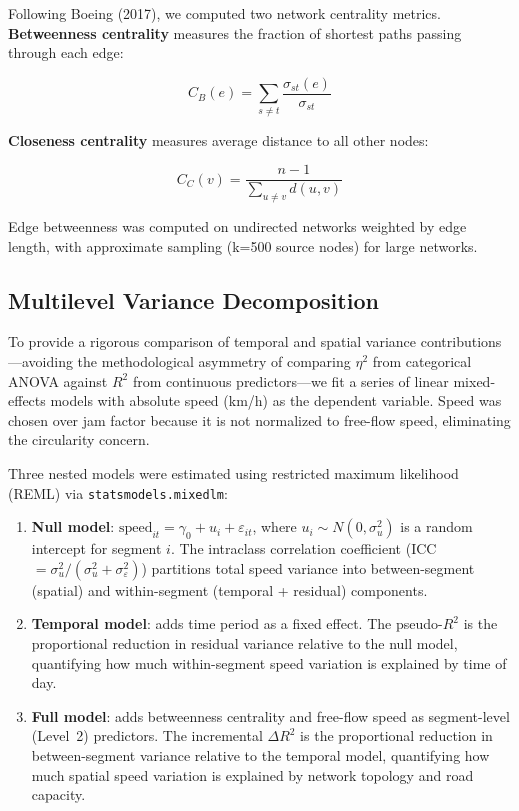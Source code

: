 \documentclass[12pt,a4paper]{article}
\begin{document}
Following Boeing (2017), we computed two network centrality metrics. \textbf{Betweenness centrality} measures the fraction of shortest paths passing through each edge:

\[C_B(e) = \sum_{s \neq t} \frac{\sigma_{st}(e)}{\sigma_{st}}\]

\textbf{Closeness centrality} measures average distance to all other nodes:

\[C_C(v) = \frac{n-1}{\sum_{u \neq v} d(u,v)}\]

Edge betweenness was computed on undirected networks weighted by edge length, with approximate sampling (k=500 source nodes) for large networks.

\subsection{Multilevel Variance Decomposition}

To provide a rigorous comparison of temporal and spatial variance contributions---avoiding the methodological asymmetry of comparing $\eta^2$ from categorical ANOVA against $R^2$ from continuous predictors---we fit a series of linear mixed-effects models with absolute speed (km/h) as the dependent variable. Speed was chosen over jam factor because it is not normalized to free-flow speed, eliminating the circularity concern.

Three nested models were estimated using restricted maximum likelihood (REML) via \texttt{statsmodels.mixedlm}:

\begin{enumerate}
  \item \textbf{Null model}: $\text{speed}_{it} = \gamma_0 + u_i + \varepsilon_{it}$, where $u_i \sim N(0, \sigma^2_u)$ is a random intercept for segment $i$. The intraclass correlation coefficient (ICC $= \sigma^2_u / (\sigma^2_u + \sigma^2_\varepsilon)$) partitions total speed variance into between-segment (spatial) and within-segment (temporal + residual) components.
  \item \textbf{Temporal model}: adds time period as a fixed effect. The pseudo-$R^2$ is the proportional reduction in residual variance relative to the null model, quantifying how much within-segment speed variation is explained by time of day.
  \item \textbf{Full model}: adds betweenness centrality and free-flow speed as segment-level (Level~2) predictors. The incremental $\Delta R^2$ is the proportional reduction in between-segment variance relative to the temporal model, quantifying how much spatial speed variation is explained by network topology and road capacity.
\end{enumerate}
\end{document}
